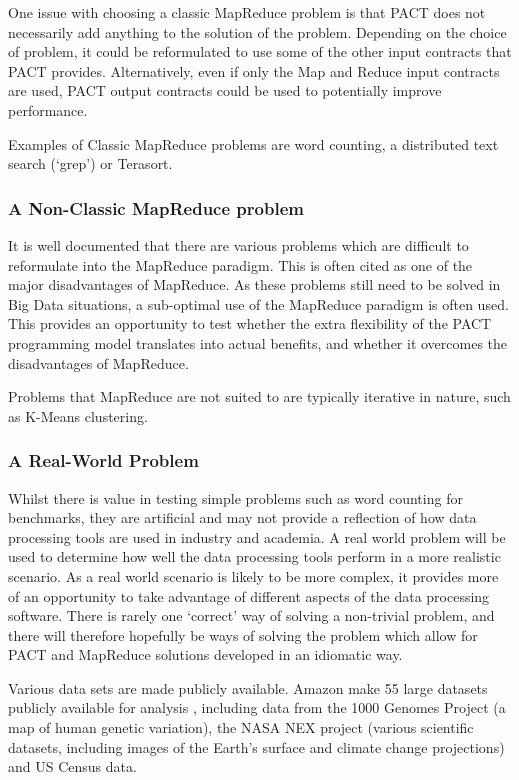 One issue with choosing a classic MapReduce problem is that PACT does not necessarily add anything to the solution of the problem. Depending on the choice of problem, it could be reformulated to use some of the other input contracts that PACT provides. Alternatively, even if only the Map and Reduce input contracts are used, PACT output contracts could be used to potentially improve performance.

Examples of Classic MapReduce problems are word counting, a distributed text search (`grep') or Terasort.

\subsubsection{A Non-Classic MapReduce problem}
It is well documented that there are various problems which are difficult to reformulate into the MapReduce paradigm. This is often cited as one of the major disadvantages of MapReduce. As these problems still need to be solved in Big Data situations, a sub-optimal use of the MapReduce paradigm is often used. This provides an opportunity to test whether the extra flexibility of the PACT programming model translates into actual benefits, and whether it overcomes the disadvantages of MapReduce. 

Problems that MapReduce are not suited to are typically iterative in nature, such as K-Means clustering.  

\subsubsection{A Real-World Problem}
Whilst there is value in testing simple problems such as word counting for benchmarks, they are artificial and may not provide a reflection of how data processing tools are used in industry and academia. A real world problem will be used to determine how well the data processing tools perform in a more realistic scenario. As a real world scenario is likely to be more complex, it provides more of an opportunity to take advantage of different aspects of the data processing software. There is rarely one `correct' way of solving a non-trivial problem, and there will therefore hopefully be ways of solving the problem which allow for PACT and MapReduce solutions developed in an idiomatic way. 

Various data sets are made publicly available. Amazon make 55 large datasets publicly available for analysis \cite{publicAmazonData}, including data from the 1000 Genomes Project (a map of human genetic variation), the NASA NEX project (various scientific datasets, including images of the Earth's surface and climate change projections) and US Census data.

